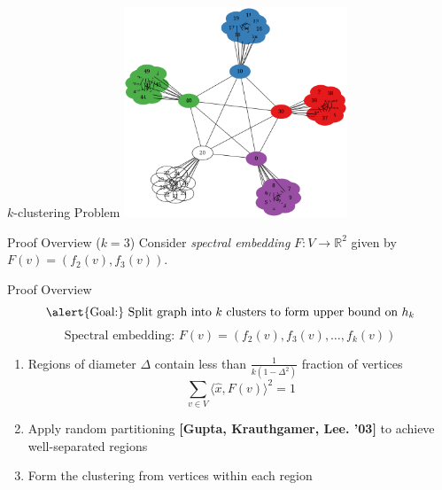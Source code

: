 \documentclass[aspectratio=169,xcolor=dvipsnames]{beamer}
\begin{document}
\begin{frame}{$k$-clustering Problem}
\centering
\includegraphics[width=0.5\textwidth]{algo-example}
\end{frame}

\begin{frame}{Proof Overview ($k = 3$)}
\pause
Consider \emph{spectral embedding} $F: V \to \mathbb{R}^2$ given by $F(v) = (f_2(v), f_3(v))$.
\pause
\centering
\def\svgwidth{0.4\columnwidth}

\end{frame}

\begin{frame}{Proof Overview}
\vspace{-2em}
\small
\[\text{\alert{Goal:} Split graph into $k$ clusters to form upper bound on $h_k$}\]
\[\text{Spectral embedding: } F(v) = (f_2(v), f_3(v), \dots, f_k(v))\]
\large
\begin{enumerate}
\item Regions of diameter $\Delta$ contain less than $\frac{1}{k(1-\Delta^2)}$ fraction of vertices
\normalsize
\[\sum_{v \in V} \langle \hat{x}, F(v) \rangle^2 = 1\]
\large
\pause
\item Apply random partitioning \small\textbf{[Gupta, Krauthgamer, Lee. '03]} \large to achieve well-separated regions
\large
\pause
\item Form the clustering from vertices within each region
\end{enumerate}
\end{frame}
\end{document}
